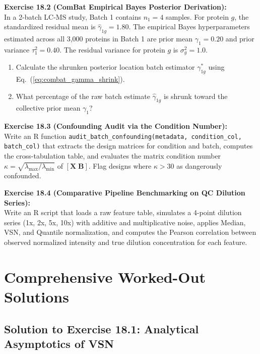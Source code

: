 \documentclass[11pt,oneside]{book}
\begin{document}
\vspace{0.8em}
\noindent
\textbf{Exercise 18.2 (ComBat Empirical Bayes Posterior Derivation):}\\
In a 2-batch LC-MS study, Batch 1 contains $n_1 = 4$ samples. For protein $g$, the standardized residual mean is $\hat{\gamma}_{1g} = 1.80$. The empirical Bayes hyperparameters estimated across all 3,000 proteins in Batch 1 are prior mean $\gamma_1 = 0.20$ and prior variance $\tau_1^2 = 0.40$. The residual variance for protein $g$ is $\sigma_g^2 = 1.0$.
\begin{enumerate}
    \item Calculate the shrunken posterior location batch estimator $\gamma_{1g}^*$ using Eq.~(\ref{eq:combat_gamma_shrink}).
    \item What percentage of the raw batch estimate $\hat{\gamma}_{1g}$ is shrunk toward the collective prior mean $\gamma_1$?
\end{enumerate}

\vspace{0.8em}
\noindent
\textbf{Exercise 18.3 (Confounding Audit via the Condition Number):}\\
Write an R function \texttt{audit\_batch\_confounding(metadata, condition\_col, batch\_col)} that extracts the design matrices for condition and batch, computes the cross-tabulation table, and evaluates the matrix condition number $\kappa = \sqrt{\lambda_{\max} / \lambda_{\min}}$ of $[\mathbf{X}\; \mathbf{B}]$. Flag designs where $\kappa > 30$ as dangerously confounded.

\vspace{0.8em}
\noindent
\textbf{Exercise 18.4 (Comparative Pipeline Benchmarking on QC Dilution Series):}\\
Write an R script that loads a raw feature table, simulates a 4-point dilution series (1x, 2x, 5x, 10x) with additive and multiplicative noise, applies Median, VSN, and Quantile normalization, and computes the Pearson correlation between observed normalized intensity and true dilution concentration for each feature.

\section{Comprehensive Worked-Out Solutions}

\subsection*{Solution to Exercise 18.1: Analytical Asymptotics of VSN}
\end{document}
